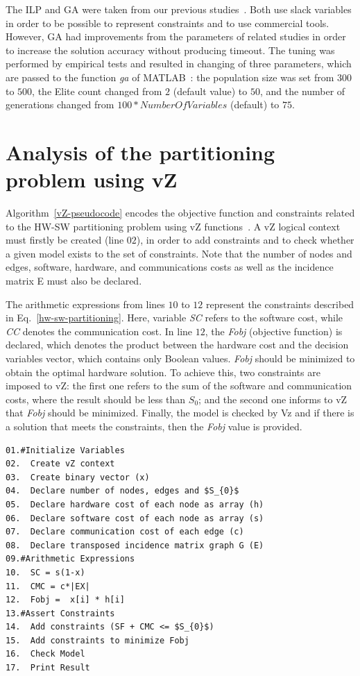 The ILP and GA were taken from our previous studies~\cite{Trindade2015,Trindade2014}. Both use slack variables in order to be possible to represent constraints and to use commercial tools. However, GA had improvements from the parameters of related studies in order to increase the solution accuracy without producing timeout. The tuning was performed by empirical tests and resulted in changing of three parameters, which are passed to the function \textit{ga} of MATLAB~\cite{TheMathWorks2013}: the population size was set from $300$ to $500$, the Elite count changed from $2$ (default value) to $50$, and the number of generations changed from $100*NumberOfVariables$ (default) to $75$.

\section{Analysis of the partitioning problem using vZ}
\label{Analysis-of-the-partitioning-problem-using-vZ}

Algorithm~\ref{vZ-pseudocode} encodes the objective function and constraints related to the HW-SW partitioning problem using vZ functions~\cite{Bjorner2014}. A vZ logical context must firstly be created (line $02$), in order to add constraints and to check whether a given model exists to the set of constraints. Note that the number of nodes and edges, software, hardware, and communications costs as well as the incidence matrix E must also be declared.

The arithmetic expressions from lines $10$ to $12$ represent the constraints described in Eq.~\ref{hw-sw-partitioning}. Here, variable \textit{SC} refers to the software cost, while \textit{CC} denotes the communication cost. In line $12$, the \textit{Fobj} (objective function) is declared, which denotes the product between the hardware cost and the decision variables vector, which contains only Boolean values. \textit{Fobj} should be minimized to obtain the optimal hardware solution. To achieve this, two constraints are imposed to vZ: the first one refers to the sum of the software and communication costs, where the result should be less than $S_0$; and the second one informs to vZ that \textit{Fobj} should be minimized. Finally, the model is checked by Vz and if there is a solution that meets the constraints, then the \textit{Fobj} value is provided.

\begin{lstlisting}[caption=Pseudocode describing vZ,label=vZ-pseudocode, mathescape]
01.#Initialize Variables
02.  Create vZ context 
03.  Create binary vector (x)
04.  Declare number of nodes, edges and $S_{0}$
05.  Declare hardware cost of each node as array (h) 
06.  Declare software cost of each node as array (s)
07.  Declare communication cost of each edge (c)
08.  Declare transposed incidence matrix graph G (E)
09.#Arithmetic Expressions
10.  SC = s(1-x)
11.  CMC = c*|EX|
12.  Fobj =  x[i] * h[i]
13.#Assert Constraints
14.  Add constraints (SF + CMC <= $S_{0}$)
15.  Add constraints to minimize Fobj
16.  Check Model
17.  Print Result
\end{lstlisting}

